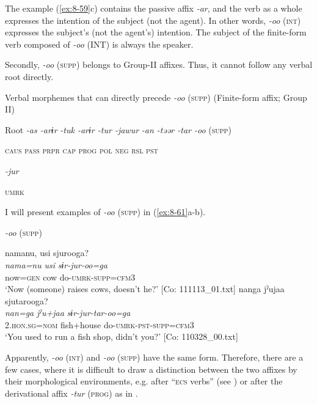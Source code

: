 The example (\ref{ex:8-59}c) contains the passive affix \textit{-ar}, and the verb as a whole expresses the intention of the subject (not the agent). In other words, \textit{-oo} (\textsc{int}) expresses the subject’s (not the agent’s) intention. The subject of the finite-form verb composed of \textit{-oo} (INT) is always the speaker.

  Secondly, \textit{-oo} (\textsc{supp}) belongs to Group-II affixes. Thus, it cannot follow any verbal root directly.

\ea\label{ex:8-60}
  Verbal morphemes that can directly precede \textit{-oo} (\textsc{supp}) (Finite-form affix; Group II)

  Root  \textit{-as  -arɨr} %
\textit{-tuk  -arɨr  -tur  -jawur} %
\textit{-an  -təər  -tar  -oo} (\textsc{supp})

    \textsc{caus}  \textsc{pass}  \textsc{prpr}  \textsc{cap}  \textsc{prog}  \textsc{pol}  \textsc{neg}  \textsc{rsl}  \textsc{pst}

          \textit{-jur}

          \textsc{umrk}
\z

I will present examples of \textit{-oo} (\textsc{supp}) in (\ref{ex:8-61}a-b).

\ea\label{ex:8-61}
  \textit{-oo} (\textsc{supp})

\ea
{\TM}
\glll  namanu,  usi  sjurooga?\\
\textit{nama=nu}  \textit{usi}  \textit{sɨr-jur-oo=ga}\\
now=\textsc{gen}  cow  do-\textsc{umrk}-\textsc{supp}=\textsc{cfm3}\\
\glt ‘Now (someone) raises cows, doesn’t he?’ [Co: 111113\_01.txt]
\ex
{\TM}
\glll  nanga  jˀujaa  sjutarooga?\\
\textit{nan=ga}  \textit{jˀu+jaa}  \textit{sɨr-jur-tar-oo=ga}\\
2.\textsc{hon}.\textsc{sg}=\textsc{nom}  fish+house  do-\textsc{umrk}-\textsc{pst}-\textsc{supp}=\textsc{cfm3}\\
\glt ‘You used to run a fish shop, didn’t you?’ [Co: 110328\_00.txt]
\z
\z

  Apparently, \textit{-oo} (\textsc{int}) and \textit{-oo} (\textsc{supp}) have the same form. Therefore, there are a few cases, where it is difficult to draw a distinction between the two affixes by their morphological environments, e.g. after “\textsc{ecs} verbs” (see ) or after the derivational affix \textit{-tur} (\textsc{prog}) as in .

